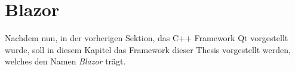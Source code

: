 \chapter{Blazor}
\label{sec:blazor}
Nachdem nun, in der vorherigen Sektion, das C++ Framework Qt vorgestellt wurde, soll in diesem
Kapitel das Framework dieser Thesis vorgestellt werden, welches den Namen \emph{Blazor} trägt.






